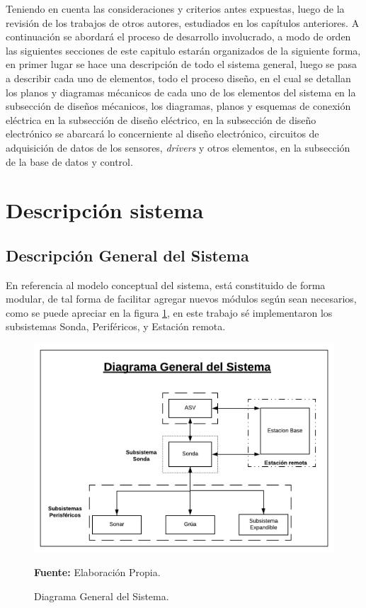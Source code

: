 Teniendo en cuenta las consideraciones y criterios antes expuestas, luego de la revisi\'on de los trabajos de otros autores, estudiados en los cap\'itulos anteriores. A continuaci\'on se abordar\'a el proceso de desarrollo involucrado, a modo de orden las siguientes secciones de este capitulo estar\'an organizados de la siguiente forma, en primer lugar se hace una descripci\'on de todo el sistema general, luego se pasa a describir cada uno de elementos, todo el proceso dise\~no, en el cual se detallan los planos y diagramas m\'ecanicos de cada uno de los elementos del sistema en la subsecci\'on de dise\~nos m\'ecanicos, los diagramas, planos y esquemas de conexi\'on el\'ectrica en la subsecci\'on de dise\~no el\'ectrico, en la subsecci\'on de dise\~no electr\'onico se abarcará lo concerniente al diseño electr\'onico, circuitos de adquisici\'on de datos de los sensores, \textit{drivers} y otros elementos, en la subsecci\'on de la base de datos y control. 

\section{Descripci\'on  sistema }
\subsection[Descripción General del Sistema]{Descripción General del Sistema}
En referencia al modelo conceptual del sistema, está constituido de forma modular, de tal forma de facilitar agregar nuevos m\'odulos seg\'un sean necesarios, como se puede apreciar en la figura \ref{fig:DiagramaGeneral}, en este trabajo sé implementaron los subsistemas Sonda, Perif\'ericos, y Estación remota.  

\begin{figure}[H]
    \centering
    \includegraphics[scale=0.4]{Imagenes/cap1/Diagrama.png}
    \caption[Diagrama General del Sistema]{Diagrama General del Sistema. }{\textbf{Fuente:} Elaboración Propia.}
    \label{fig:DiagramaGeneral}
\end{figure}

